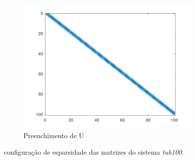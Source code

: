 \documentclass{article}
\begin{document}
\begin{figure}[H]
\begin{subfigure}[b]{0.3\textwidth}
         \centering
         \includegraphics[width=\textwidth]{image/tub100spyU.png}
         \caption{Preenchimento de U}
         \label{fig:tub100-spyU}
    \end{subfigure}
    \hfill
    \caption{configuração de esparsidade das matrizes do sistema \textit{tub100}.}
    \label{fig:tub100}
\end{figure}
\end{document}

